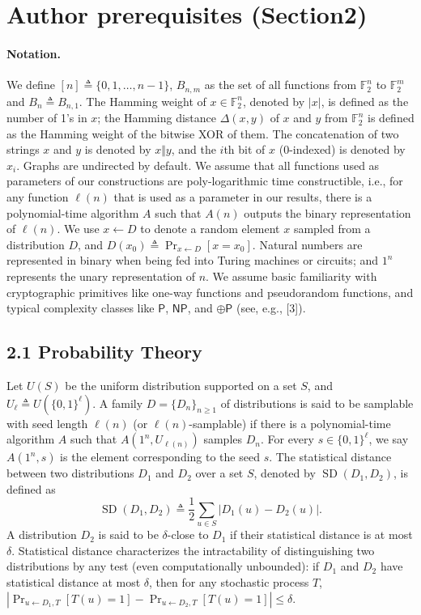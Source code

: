 \section*{Author prerequisites (Section2)}
\paragraph{Notation.} We define $[n]\triangleq\{0,1,\ldots,n-1\}$, $B_{n,m}$ as the set of all functions from $\mathbb F_2^n$ to $\mathbb F_2^m$ and $B_n\triangleq B_{n,1}$. The Hamming weight of $x\in\mathbb F_2^n$, denoted by $|x|$, is defined as the number of 1's in $x$; the Hamming distance $\Delta(x,y)$ of $x$ and $y$ from $\mathbb F_2^n$ is defined as the Hamming weight of the bitwise XOR of them. The concatenation of two strings $x$ and $y$ is denoted by $x\Vert y$, and the $i$th bit of $x$ (0-indexed) is denoted by $x_i$. Graphs are undirected by default. We assume that all functions used as parameters of our constructions are poly-logarithmic time constructible, i.e., for any function $\ell(n)$ that is used as a parameter in our results, there is a polynomial-time algorithm $A$ such that $A(n)$ outputs the binary representation of $\ell(n)$.
We use $x\leftarrow D$ to denote a random element $x$ sampled from a distribution $D$, and $D(x_0)\triangleq\Pr_{x\leftarrow D}[x=x_0]$. Natural numbers are represented in binary when being fed into Turing machines or circuits; and $1^n$ represents the unary representation of $n$. We assume basic familiarity with cryptographic primitives like one-way functions and pseudorandom functions, and typical complexity classes like $\mathsf P$, $\mathsf{NP}$, and $\oplus\mathsf P$ (see, e.g., [3]).
\subsection*{2.1 Probability Theory}
Let $U(S)$ be the uniform distribution supported on a set $S$, and $U_\ell\triangleq U(\{0,1\}^\ell)$. A family $D=\{D_n\}_{n\ge1}$ of distributions is said to be samplable with seed length $\ell(n)$ (or $\ell(n)$-samplable) if there is a polynomial-time algorithm $A$ such that $A(1^n,U_{\ell(n)})$ samples $D_n$. For every $s\in\{0,1\}^\ell$, we say $A(1^n,s)$ is the element corresponding to the seed $s$.
The statistical distance between two distributions $D_1$ and $D_2$ over a set $S$, denoted by $\operatorname{SD}(D_1,D_2)$, is defined as
\[\operatorname{SD}(D_1,D_2)\triangleq\frac12\sum_{u\in S}|D_1(u)-D_2(u)|.\]
A distribution $D_2$ is said to be $\delta$-close to $D_1$ if their statistical distance is at most $\delta$. Statistical distance characterizes the intractability of distinguishing two distributions by any test (even computationally unbounded): if $D_1$ and $D_2$ have statistical distance at most $\delta$, then for any stochastic process $T$, $|\Pr_{u\leftarrow D_1,T}[T(u)=1]-\Pr_{u\leftarrow D_2,T}[T(u)=1]|\le\delta$.
